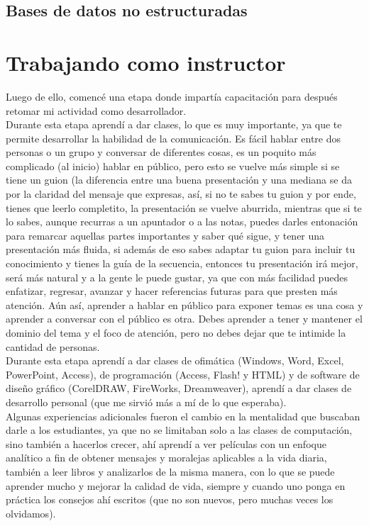 \documentclass[12pt,spanish,lettersize]{book}
\begin{document}
\subsection{Bases de datos no estructuradas}

\section{Trabajando como instructor}

Luego de ello, comencé una etapa donde impartía capacitación para después retomar mi actividad como desarrollador.\\

Durante esta etapa aprendí a dar clases, lo que es muy importante, ya que te permite desarrollar la habilidad de la comunicación. Es fácil hablar entre dos personas o un grupo y conversar de diferentes cosas, es un poquito más complicado (al inicio) hablar en público, pero esto se vuelve más simple si se tiene un guion (la diferencia entre una buena presentación y una mediana se da por la claridad del mensaje que expresas, así, si no te sabes tu guion y por ende, tienes que leerlo completito, la presentación se vuelve aburrida, mientras que si te lo sabes, aunque recurras a un apuntador o a las notas, puedes darles entonación para remarcar aquellas partes importantes y saber qué sigue, y tener una presentación más fluida, si además de eso sabes adaptar tu guion para incluir tu conocimiento y tienes la guía de la secuencia, entonces tu presentación irá mejor, será más natural y a la gente le puede gustar, ya que con más facilidad puedes enfatizar, regresar, avanzar y hacer referencias futuras para que presten más atención. Aún así, aprender a hablar en público para exponer temas es una cosa y aprender a conversar con el público es otra. Debes aprender a tener y mantener el dominio del tema y el foco de atención, pero no debes dejar que te intimide la cantidad de personas.\\

Durante esta etapa aprendí a dar clases de ofimática (Windows, Word, Excel, PowerPoint, Access), de programación (Access, Flash! y HTML) y de software de diseño gráfico (CorelDRAW, FireWorks, Dreamweaver), aprendí a dar clases de desarrollo personal (que me sirvió más a mí de lo que esperaba).\\

Algunas experiencias adicionales fueron el cambio en la mentalidad que buscaban darle a los estudiantes, ya que no se limitaban solo a las clases de computación, sino también a hacerlos crecer, ahí aprendí a ver películas con un enfoque analítico a fin de obtener mensajes y moralejas aplicables a la vida diaria, también a leer libros y analizarlos de la misma manera, con lo que se puede aprender mucho y mejorar la calidad de vida, siempre y cuando uno ponga en práctica los consejos ahí escritos (que no son nuevos, pero muchas veces los olvidamos).\\
\end{document}
